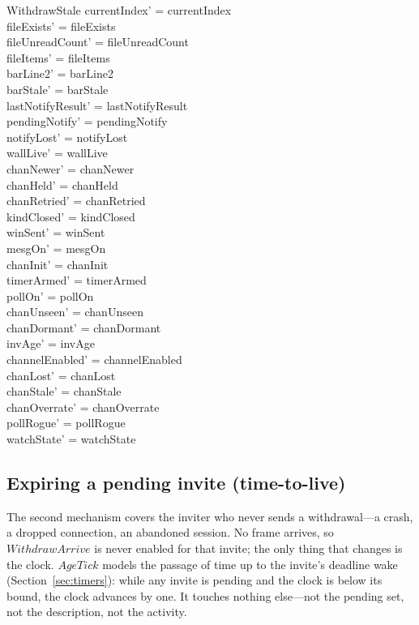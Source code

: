 \documentclass[a4paper,10pt,fleqn]{article}
\begin{document}
\begin{schema}{WithdrawStale}
  currentIndex' = currentIndex \\
  fileExists' = fileExists \\
  fileUnreadCount' = fileUnreadCount \\
  fileItems' = fileItems \\
  barLine2' = barLine2 \\
  barStale' = barStale \\
  lastNotifyResult' = lastNotifyResult \\
  pendingNotify' = pendingNotify \\
  notifyLost' = notifyLost \\
  wallLive' = wallLive \\
  chanNewer' = chanNewer \\
  chanHeld' = chanHeld \\
  chanRetried' = chanRetried \\
  kindClosed' = kindClosed \\
  winSent' = winSent \\
  mesgOn' = mesgOn \\
  chanInit' = chanInit \\
  timerArmed' = timerArmed \\
  pollOn' = pollOn \\
  chanUnseen' = chanUnseen \\
  chanDormant' = chanDormant \\
  invAge' = invAge \\
  channelEnabled' = channelEnabled \\
  chanLost' = chanLost \\
  chanStale' = chanStale \\
  chanOverrate' = chanOverrate \\
  pollRogue' = pollRogue \\
  watchState' = watchState
\end{schema}

\subsection{Expiring a pending invite (time-to-live)}

The second mechanism covers the inviter who never sends a withdrawal---a
crash, a dropped connection, an abandoned session.  No frame arrives, so
$WithdrawArrive$ is never enabled for that invite; the only thing that
changes is the clock.  $AgeTick$ models the passage of time up to the
invite's deadline wake (Section~\ref{sec:timers}): while any invite is
pending and the clock is below its bound, the clock advances by one.  It touches nothing else---not the pending set, not
the description, not the activity.
\end{document}
